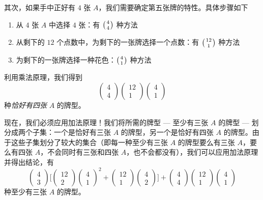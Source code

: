 \begin{example}[至少三张 $A$]
    其次，如果手中正好有 $4$ 张 $A$，我们需要确定第五张牌的特性。具体步骤如下
    \begin{enumerate}
        \item 从 $4$ 张 $A$ 中选择 $4$ 张：有 $\big({4 \atop 4}\big)$ 种方法
        \item 从剩下的 $12$ 个点数中，为剩下的一张牌选择一个点数：有 $\big({12 \atop 1}\big)$ 种方法
        \item 为剩下的一张牌选择一种花色：$\big({4 \atop 1}\big)$ 种方法
    \end{enumerate}
    利用乘法原理，我们得到
    \[\begin{pmatrix}
            4 \\
            4
        \end{pmatrix}\begin{pmatrix}
            12 \\
            1
        \end{pmatrix}\begin{pmatrix}
            4 \\
            1
        \end{pmatrix}\]
    种\emph{恰好有四张} $A$ 的牌型。

    现在，我们必须应用加法原理！我们将所需的牌型 --- 至少有三张 $A$ 的牌型 --- 划分成两个子集：一个是恰好有三张 $A$ 的牌型，另一个是恰好有四张 $A$ 的牌型。由于这些子集划分了较大的集合（即每一种至少有三张 $A$ 的牌型要么有三张 $A$，要么有四张 $A$，不会同时有三张和四张 $A$，也不会都没有），我们可以应用加法原理并得出结论，有
    \[\begin{pmatrix}
            4 \\
            3
        \end{pmatrix}\Bigg[\begin{pmatrix}
                12 \\
                2
            \end{pmatrix} \begin{pmatrix}
                4 \\
                1
            \end{pmatrix}^2 + \begin{pmatrix}
                12 \\
                1
            \end{pmatrix} \begin{pmatrix}
                4 \\
                2
            \end{pmatrix}\Bigg] + \begin{pmatrix}
            4 \\
            4
        \end{pmatrix}\begin{pmatrix}
            12 \\
            1
        \end{pmatrix}\begin{pmatrix}
            4 \\
            1
        \end{pmatrix}\]
    种至少有三张 $A$ 的牌型。


\end{example}

